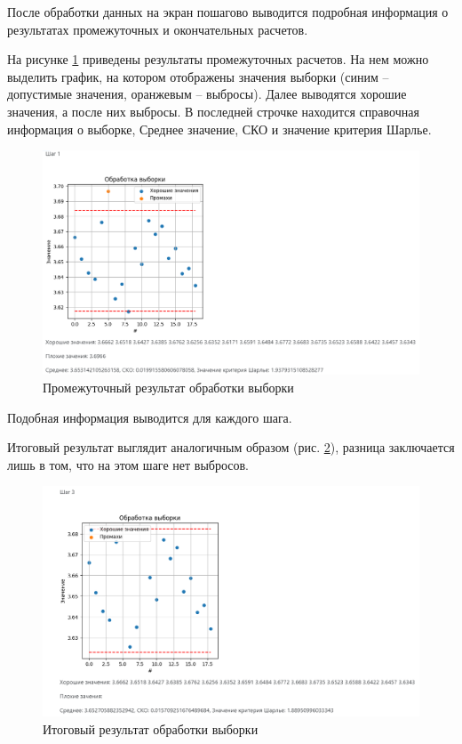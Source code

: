 \documentclass[a4paper,14pt]{article}
\begin{document}
	После обработки данных на экран пошагово выводится подробная информация о результатах промежуточных и окончательных расчетов.
	
	На рисунке \ref{fig:screenshot004} приведены результаты промежуточных расчетов.
	На нем можно выделить график, на котором отображены значения выборки (синим -- допустимые значения, оранжевым -- выбросы).
	Далее выводятся хорошие значения, а после них выбросы.
	В последней строчке находится справочная информация о выборке, Среднее значение, СКО и значение критерия Шарлье. 
	
	\begin{figure}[H]
		\centering
		\includegraphics[width=0.95\linewidth]{images/screenshot004}
		\caption{Промежуточный результат обработки выборки}
		\label{fig:screenshot004}
	\end{figure}
	
	Подобная информация выводится для каждого шага.	
	
	Итоговый результат выглядит аналогичным образом (рис. \ref{fig:screenshot005}), разница заключается лишь в том, что на этом шаге нет выбросов.
	
	\begin{figure}[H]
		\centering
		\includegraphics[width=0.95\linewidth]{images/screenshot005}
		\caption{Итоговый результат обработки выборки}
		\label{fig:screenshot005}
	\end{figure}
\end{document}
